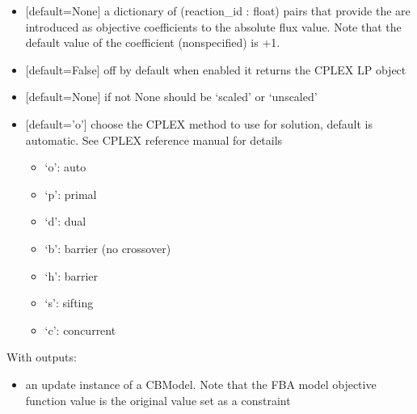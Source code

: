 \documentclass[letterpaper,10pt,english]{sphinxmanual}
\begin{document}
\begin{fulllineitems}
\begin{itemize}
\item {} 
\sphinxAtStartPar
{} {[}default=None{]} a dictionary of (reaction\_id : float) pairs that provide the are introduced as objective coefficients to the absolute flux value. Note that the default value of the coefficient (non\sphinxhyphen{}specified) is +1.

\item {} 
\sphinxAtStartPar
{} {[}default=False{]} off by default when enabled it returns the CPLEX LP object

\item {} 
\sphinxAtStartPar
{} {[}default=None{]} if not None should be ‘scaled’ or ‘unscaled’

\item {} 
\sphinxAtStartPar
{} {[}default=’o’{]} choose the CPLEX method to use for solution, default is automatic. See CPLEX reference manual for details
\begin{itemize}
\item {} 
\sphinxAtStartPar
‘o’: auto

\item {} 
\sphinxAtStartPar
‘p’: primal

\item {} 
\sphinxAtStartPar
‘d’: dual

\item {} 
\sphinxAtStartPar
‘b’: barrier (no crossover)

\item {} 
\sphinxAtStartPar
‘h’: barrier

\item {} 
\sphinxAtStartPar
‘s’: sifting

\item {} 
\sphinxAtStartPar
‘c’: concurrent

\end{itemize}

\end{itemize}

\sphinxAtStartPar
With outputs:
\begin{itemize}
\item {} 
\sphinxAtStartPar
{} an update instance of a CBModel. Note that the FBA model objective function value is the original value set as a constraint

\end{itemize}

\end{fulllineitems}
\end{document}

